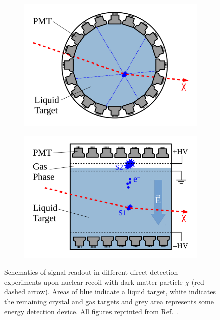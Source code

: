 \begin{figure}[!ht]
\begin{subfigure}{0.49\textwidth}
         \includegraphics[width=\textwidth]{figures/DMOverview/singlephase.pdf}
         \caption{}
         \label{fig:DMOverview/singlephase}
     \end{subfigure}
     \hfill
     \begin{subfigure}{0.49\textwidth}
         \centering
         \includegraphics[width=\textwidth]{figures/DMOverview/dualphase.pdf}
         \caption{}
         \label{fig:DMOverview/dualphase}
     \end{subfigure}
     \caption[Schematics of signal readout in different direct detection experiments.]{Schematics of signal readout in different direct detection experiments upon nuclear recoil with dark matter particle $\chi$ (red dashed arrow). Areas of blue indicate a liquid target, white indicates the remaining crystal and gas targets and grey area represents some energy detection device. All figures reprinted from Ref.~\cite{Schumann:2019eaa}.}
     \label{fig:DMOverview/DDSetups}
\end{figure}

